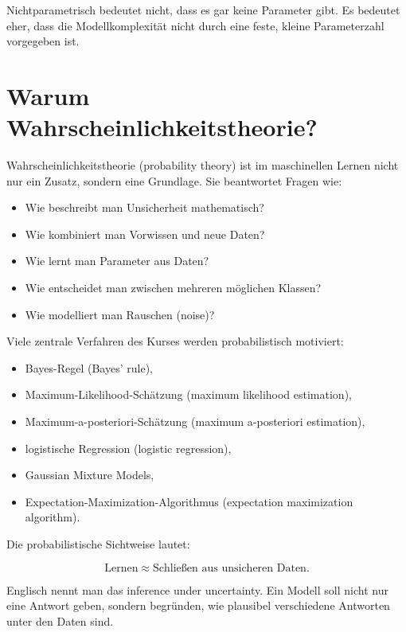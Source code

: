\begin{notebox}
Nichtparametrisch bedeutet nicht, dass es gar keine Parameter gibt.
Es bedeutet eher, dass die Modellkomplexität nicht durch eine feste, kleine Parameterzahl vorgegeben ist.
\end{notebox}

\section{Warum Wahrscheinlichkeitstheorie?}

Wahrscheinlichkeitstheorie (probability theory) ist im maschinellen Lernen nicht nur ein Zusatz, sondern eine Grundlage.
Sie beantwortet Fragen wie:

\begin{itemize}
    \item Wie beschreibt man Unsicherheit mathematisch?
    \item Wie kombiniert man Vorwissen und neue Daten?
    \item Wie lernt man Parameter aus Daten?
    \item Wie entscheidet man zwischen mehreren möglichen Klassen?
    \item Wie modelliert man Rauschen (noise)?
\end{itemize}

Viele zentrale Verfahren des Kurses werden probabilistisch motiviert:

\begin{itemize}
    \item Bayes-Regel (Bayes' rule),
    \item Maximum-Likelihood-Schätzung (maximum likelihood estimation),
    \item Maximum-a-posteriori-Schätzung (maximum a-posteriori estimation),
    \item logistische Regression (logistic regression),
    \item Gaussian Mixture Models,
    \item Expectation-Maximization-Algorithmus (expectation maximization algorithm).
\end{itemize}

\begin{conceptbox}
Die probabilistische Sichtweise lautet:

\[
    \text{Lernen}
    \approx
    \text{Schließen aus unsicheren Daten}.
\]

Englisch nennt man das inference under uncertainty.
Ein Modell soll nicht nur eine Antwort geben, sondern begründen, wie plausibel verschiedene Antworten unter den Daten sind.
\end{conceptbox}

